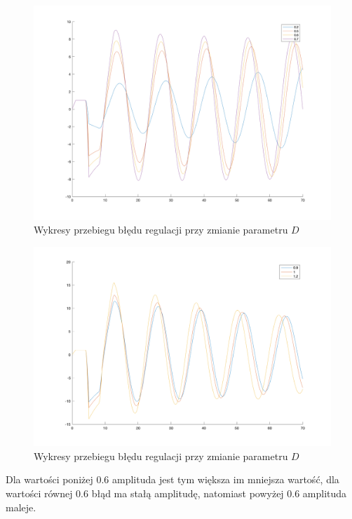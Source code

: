 \documentclass[a4paper,10pt]{article}
\begin{document}
\begin{figure}[!h]
    \centering
	\includegraphics[width=120mm]{pid_1.png}
	\caption{Wykresy przebiegu błędu regulacji przy zmianie parametru $D$}
    \label{fig:symulacjaPID}
\end{figure}

\newpage

\begin{figure}[!h]
	\centering
	\includegraphics[width=120mm]{pid_2.png}
	\caption{Wykresy przebiegu błędu regulacji przy zmianie parametru $D$}
	\label{fig:symulacjaPID}
\end{figure}

Dla wartości poniżej 0.6 amplituda jest tym większa im mniejsza wartość, dla wartości równej 0.6 błąd ma stałą amplitudę, natomiast powyżej 0.6 amplituda maleje.
\end{document}
